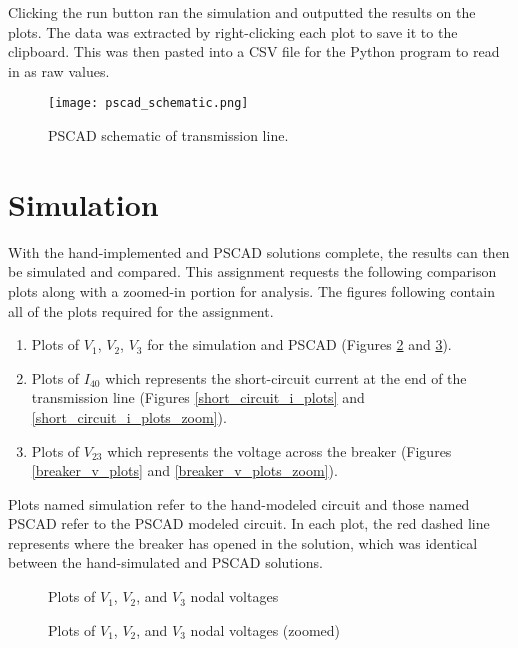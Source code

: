 \documentclass[10pt, oneside, letterpaper]{article}
\begin{document}
Clicking the run button ran the simulation and outputted the results on the plots. The data was extracted by right-clicking each plot{} to save it to the clipboard. This was then pasted into a CSV file for the Python program to read in as raw values.

\begin{figure}[H]
\centering
\texttt{[image: pscad\_schematic.png]}
\caption{PSCAD schematic of transmission line.}
\label{pscad-setup}
\end{figure}

\section{Simulation}

With the hand-implemented and PSCAD solutions complete, the results can then be simulated and compared. This assignment requests the following comparison plots along with a zoomed-in portion for analysis. The figures following contain all of the plots required for the assignment.

\begin{enumerate}[label=\alph*)]
  \item Plots of $V_1$, $V_2$, $V_3$ for the simulation and PSCAD (Figures \ref{nodal_v_plots} and \ref{nodal_v_plots_zoom}).
  \item Plots of $I_{40}$ which represents the short-circuit current at the end of the transmission line (Figures \ref{short_circuit_i_plots} and \ref{short_circuit_i_plots_zoom}).
  \item Plots of $V_{23}$ which represents the voltage across the breaker (Figures \ref{breaker_v_plots} and \ref{breaker_v_plots_zoom}).
\end{enumerate}

Plots named simulation refer to the hand-modeled circuit and those named PSCAD refer to the PSCAD modeled circuit. In each plot, the red dashed line represents where the breaker has opened in the solution, which was identical between the hand-simulated and PSCAD solutions.

\begin{figure}[H]
    \begin{center}
        
    \end{center}
    \caption{Plots of $V_{1}$, $V_{2}$, and $V_{3}$ nodal voltages}
    \label{nodal_v_plots}
\end{figure}

\begin{figure}[H]
    \begin{center}
        
    \end{center}
    \caption{Plots of $V_{1}$, $V_{2}$, and $V_{3}$ nodal voltages (zoomed)}
    \label{nodal_v_plots_zoom}
\end{figure}
\end{document}
